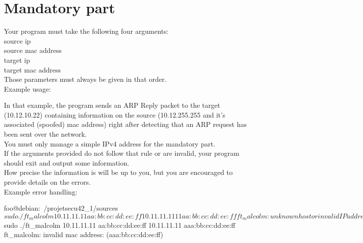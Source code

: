 \documentclass{42-en}
\begin{document}
\chapter{Mandatory part}

    Your program must take the following four arguments:\\
    source ip\\
    source mac address\\
    target ip\\
    target mac address\\
    Those parameters must always be given in that order.\\

        Example usage:

    In that example, the program sends an ARP Reply packet to the target (10.12.10.22) containing information on the source (10.12.255.255 and it's associated (spoofed) mac address)
    right after detecting that an ARP request has been sent over the network.\\

    You must only manage a simple IPv4 address for the mandatory part.\\
    If the arguments provided do not follow that rule or are invalid, your program should exit and output some information.\\
    How precise the information is will be up to you, but you are encouraged to provide details on the errors.\\

        Example error handling:
            \begin{42console}
    foo@debian:~/projetsecu42_1/sources$ sudo ./ft_malcolm 10.11.11.11 aa:bb:cc:dd:ee:ff 10.11.11.1111 aa:bb:cc:dd:ee:ff
    ft_malcolm: unknown host or invalid IP address: (10.11.11.1111).

    foo@debian:~/projetsecu42_1/sources$ sudo ./ft_malcolm 10.11.11.11 aa:bb:cc:dd:ee:ff 10.11.11.11 aaa:bb:cc:dd:ee:ff
    ft_malcolm: invalid mac address: (aaa:bb:cc:dd:ee:ff)\end{42console}
\end{document}
